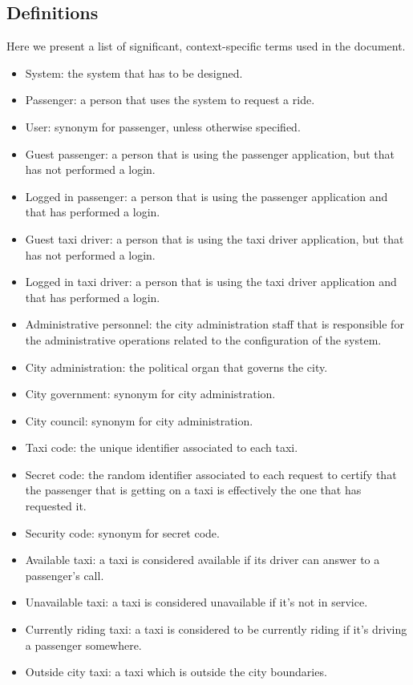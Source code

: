 \subsection{Definitions}
Here we present a list of significant, context-specific terms used in the document.
\begin{itemize}
\item System: the system that has to be designed. 
\item Passenger: a person that uses the system to request a ride.
\item User: synonym for passenger, unless otherwise specified.
\item Guest passenger: a person that is using the passenger application, but that has not performed a login. 
\item Logged in passenger: a person that is using the passenger application and that has performed a login. 
\item Guest taxi driver: a person that is using the taxi driver application, but that has not performed a login. 
\item Logged in taxi driver: a person that is using the taxi driver application and that has performed a login. 
\item Administrative personnel: the city administration staff that is responsible for the administrative operations related to the configuration of the system.
\item City administration: the political organ that governs the city.
\item City government: synonym for city administration.
\item City council:  synonym for city administration.
\item Taxi code: the unique identifier associated to each taxi.
\item Secret code: the random identifier associated to each request to certify that the passenger that is getting on a taxi is effectively the one that has requested it.
\item Security code: synonym for secret code.
\item Available taxi: a taxi is considered available if its driver can answer to a passenger's call.
\item Unavailable taxi:  a taxi is considered unavailable if it's not in service.
\item Currently riding taxi: a taxi is considered to be currently riding if it's driving a passenger somewhere. 
\item Outside city taxi: a taxi which is outside the city boundaries. 

\end{itemize}
